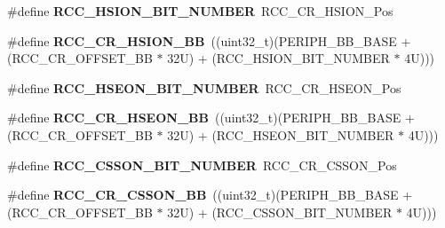 \begin{DoxyCompactItemize}
\item 
\mbox{\label{group___r_c_c___bit_address___alias_region_ga9bf60daa74224ea82d3df7e08d4533f1}} 
\#define {\bfseries R\+C\+C\+\_\+\+H\+S\+I\+O\+N\+\_\+\+B\+I\+T\+\_\+\+N\+U\+M\+B\+ER}~R\+C\+C\+\_\+\+C\+R\+\_\+\+H\+S\+I\+O\+N\+\_\+\+Pos
\item 
\mbox{\label{group___r_c_c___bit_address___alias_region_gabd3eca3cc8b1501f9d8a62c4a0ebcfe7}} 
\#define {\bfseries R\+C\+C\+\_\+\+C\+R\+\_\+\+H\+S\+I\+O\+N\+\_\+\+BB}~((uint32\+\_\+t)(P\+E\+R\+I\+P\+H\+\_\+\+B\+B\+\_\+\+B\+A\+SE + (R\+C\+C\+\_\+\+C\+R\+\_\+\+O\+F\+F\+S\+E\+T\+\_\+\+BB $\ast$ 32\+U) + (\+R\+C\+C\+\_\+\+H\+S\+I\+O\+N\+\_\+\+B\+I\+T\+\_\+\+N\+U\+M\+B\+E\+R $\ast$ 4\+U)))
\item 
\mbox{\label{group___r_c_c___bit_address___alias_region_gaa9092b285e421195958ef49d9396b321}} 
\#define {\bfseries R\+C\+C\+\_\+\+H\+S\+E\+O\+N\+\_\+\+B\+I\+T\+\_\+\+N\+U\+M\+B\+ER}~R\+C\+C\+\_\+\+C\+R\+\_\+\+H\+S\+E\+O\+N\+\_\+\+Pos
\item 
\mbox{\label{group___r_c_c___bit_address___alias_region_gabefdd36d54615fa5771dccb9985ec3b6}} 
\#define {\bfseries R\+C\+C\+\_\+\+C\+R\+\_\+\+H\+S\+E\+O\+N\+\_\+\+BB}~((uint32\+\_\+t)(P\+E\+R\+I\+P\+H\+\_\+\+B\+B\+\_\+\+B\+A\+SE + (R\+C\+C\+\_\+\+C\+R\+\_\+\+O\+F\+F\+S\+E\+T\+\_\+\+BB $\ast$ 32\+U) + (\+R\+C\+C\+\_\+\+H\+S\+E\+O\+N\+\_\+\+B\+I\+T\+\_\+\+N\+U\+M\+B\+E\+R $\ast$ 4\+U)))
\item 
\mbox{\label{group___r_c_c___bit_address___alias_region_gaa8a1695db870d271a9e79bf0272ec8b6}} 
\#define {\bfseries R\+C\+C\+\_\+\+C\+S\+S\+O\+N\+\_\+\+B\+I\+T\+\_\+\+N\+U\+M\+B\+ER}~R\+C\+C\+\_\+\+C\+R\+\_\+\+C\+S\+S\+O\+N\+\_\+\+Pos
\item 
\mbox{\label{group___r_c_c___bit_address___alias_region_ga37c353c62ad303e661e99f20dcc6d1f0}} 
\#define {\bfseries R\+C\+C\+\_\+\+C\+R\+\_\+\+C\+S\+S\+O\+N\+\_\+\+BB}~((uint32\+\_\+t)(P\+E\+R\+I\+P\+H\+\_\+\+B\+B\+\_\+\+B\+A\+SE + (R\+C\+C\+\_\+\+C\+R\+\_\+\+O\+F\+F\+S\+E\+T\+\_\+\+BB $\ast$ 32\+U) + (\+R\+C\+C\+\_\+\+C\+S\+S\+O\+N\+\_\+\+B\+I\+T\+\_\+\+N\+U\+M\+B\+E\+R $\ast$ 4\+U)))

\end{DoxyCompactItemize}
